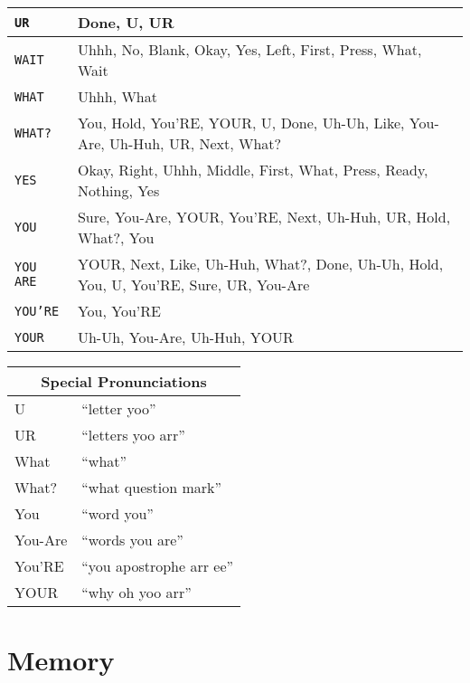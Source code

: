 \documentclass[11pt]{amsart}
\begin{document}
\begin{tabular}{|l|p{4.5in}|}
\texttt{UR}      & Done, U, UR \\ \hline
\texttt{WAIT}    & Uhhh, No, Blank, Okay, Yes, Left, First, Press, What, Wait
                   \\ \hline
\texttt{WHAT}    & Uhhh, What \\ \hline
\texttt{WHAT?}   & You, Hold, You'RE, YOUR, U, Done, Uh-Uh, Like, You-Are,
                   Uh-Huh, UR, Next, What? \\ \hline
\texttt{YES}     & Okay, Right, Uhhh, Middle, First, What, Press, Ready,
                   Nothing, Yes \\ \hline
\texttt{YOU}     & Sure, You-Are, YOUR, You'RE, Next, Uh-Huh, UR, Hold, What?,
                   You \\ \hline
\texttt{YOU ARE} & YOUR, Next, Like, Uh-Huh, What?, Done, Uh-Uh, Hold, You, U,
                   You'RE, Sure, UR, You-Are \\ \hline
\texttt{YOU'RE}  & You, You'RE \\ \hline
\texttt{YOUR}    & Uh-Uh, You-Are, Uh-Huh, YOUR \\ \hline
\end{tabular}

\begin{tabular}{|l|l|}
\hline
\multicolumn{2}{|c|}{Special Pronunciations} \\
\hline
U       & ``letter yoo'' \\
UR      & ``letters yoo arr'' \\
What    & ``what'' \\
What?   & ``what question mark'' \\
You     & ``word you'' \\
You-Are & ``words you are'' \\
You'RE  & ``you apostrophe arr ee'' \\
YOUR    & ``why oh yoo arr'' \\
\hline
\end{tabular}



\section{Memory}
\end{document}
